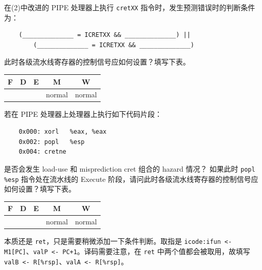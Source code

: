 \begin{problems}
        \qn 在(2)中改进的 PIPE 处理器上执行 \verb|cretXX| 指令时，发生预测错误时的判断条件为：
        \begin{verbatim}
    (______________ = ICRETXX && ______________) ||
        (______________ = ICRETXX && ______________)
        \end{verbatim}
        此时各级流水线寄存器的控制信号应如何设置？填写下表。
        \begin{table}[H]
            \centering
            \begin{tabular}{|c|c|c|c|c|}
                \hline
                F & D & E & M & W \\ \hline
                {\qquad \qquad} & {\qquad \qquad} & {\qquad \qquad} & normal & normal \\ \hline
            \end{tabular}
        \end{table}
        \qn 若在 PIPE 处理器上处理器上执行如下代码片段：
        \begin{verbatim}
    0x000: xorl   %eax, %eax
    0x002: popl   %esp
    0x004: cretne
        \end{verbatim}
            \subqn 是否会发生 load-use 和 misprediction cret 组合的 hazard 情况？
            \subqn 如果此时 \verb|popl %esp| 指令处在流水线的 Execute 阶段，请问此时各级流水线寄存器的控制信号应如何设置？填写下表。
            \begin{table}[H]
                \centering
                \begin{tabular}{|c|c|c|c|c|}
                    \hline
                    F & D & E & M & W \\ \hline
                    {\qquad \qquad} & {\qquad \qquad} & {\qquad \qquad} & normal & normal \\ \hline
                \end{tabular}
            \end{table}
        \sol 本质还是 \verb|ret|，只是需要稍微添加一下条件判断。取指是 \verb|icode:ifun <- M1[PC]|、\verb|valP <- PC+1|。译码需要注意，在 \verb|ret| 中两个值都会被取用，故填写 \verb|valB <- R[%rsp]|、\verb|valA <- R[%rsp]|。
        

\end{problems}
